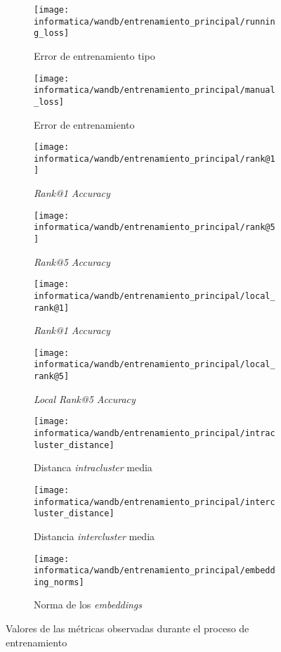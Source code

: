 \begin{figure}[!hbtp]
    \centering
    \begin{subfigure}[t]{0.45\textwidth}
        \texttt{[image: informatica/wandb/entrenamiento\_principal/running\_loss]}
        \caption{Error de entrenamiento tipo }
    \end{subfigure}
    \begin{subfigure}[t]{0.45\textwidth}
        \texttt{[image: informatica/wandb/entrenamiento\_principal/manual\_loss]}
        \caption{Error de entrenamiento}
    \end{subfigure}

    \begin{subfigure}[t]{0.45\textwidth}
        \texttt{[image: informatica/wandb/entrenamiento\_principal/rank@1]}
        \caption{\textit{Rank@1 Accuracy}}
    \end{subfigure}
    \begin{subfigure}[t]{0.45\textwidth}
        \texttt{[image: informatica/wandb/entrenamiento\_principal/rank@5]}
        \caption{\textit{Rank@5 Accuracy}}
    \end{subfigure}

    \begin{subfigure}[t]{0.45\textwidth}
        \texttt{[image: informatica/wandb/entrenamiento\_principal/local\_rank@1]}
        \caption{\textit{Rank@1 Accuracy}}
    \end{subfigure}
    \begin{subfigure}[t]{0.45\textwidth}
        \texttt{[image: informatica/wandb/entrenamiento\_principal/local\_rank@5]}
        \caption{\textit{Local Rank@5 Accuracy}}
    \end{subfigure}

    \begin{subfigure}[t]{0.45\textwidth}
        \texttt{[image: informatica/wandb/entrenamiento\_principal/intracluster\_distance]}
        \caption{Distanca \textit{intracluster} media}
    \end{subfigure}
    \begin{subfigure}[t]{0.45\textwidth}
        \texttt{[image: informatica/wandb/entrenamiento\_principal/intercluster\_distance]}
        \caption{Distancia \textit{intercluster} media}
    \end{subfigure}

    \begin{subfigure}[t]{0.45\textwidth}
        \texttt{[image: informatica/wandb/entrenamiento\_principal/embedding\_norms]}
        \caption{Norma de los \textit{embeddings}}
    \end{subfigure}

    \caption{Valores de las métricas observadas durante el proceso de entrenamiento}
    \label{img:metricas_entrenamiento}
\end{figure}

